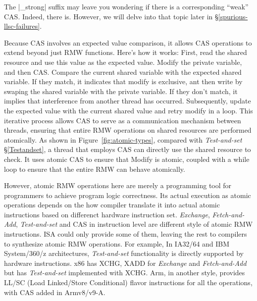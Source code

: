 \documentclass[fontsize=10pt, oneside]{scrartcl}
\newcommand{\fig}[1]{Figure~\ref{#1}}
\newcommand{\introduce}[1]{\textit{#1}}
\newcommand{\secref}[1]{\hyperref[#1]{\textsc{\S}\ref*{#1}}}
\begin{document}
\begin{samepage}
\noindent The \cpp|_strong| suffix may leave you wondering if there is a corresponding ``weak'' \textsc{CAS}.
Indeed, there is. However, we will delve into that topic later in \secref{spurious-llsc-failures}.
\end{samepage}

Because \textsc{CAS} involves an expected value comparison, 
it allows \textsc{CAS} operations to extend beyond just \textsc{RMW} functions. 
Here's how it works: First, read the shared resource and use this value as the expected value. 
Modify the private variable, and then \textsc{CAS}. Compare the current shared variable with the expected shared variable. 
If they match, it indicates that modify is exclusive, ant then write by swaping the shared variable with the private variable.
If they don't match, it implies that interference from another thread has occurred.
Subsequently, update the expected value with the current shared value and retry modify in a loop. 
This iterative process allows \textsc{CAS} to serve as a communication mechanism between threads, 
ensuring that entire \textsc{RMW} operations on shared resources are performed atomically.
As shown in \fig{fig:atomic-types}, compared with \introduce{Test-and-set} \secref{Testandset}, 
a thread that employs \textsc{CAS} can directly use the shared resource to check.
It uses atomic \textsc{CAS} to ensure that Modify is atomic, 
coupled with a while loop to ensure that the entire \textsc{RMW} can behave atomically.

However, atomic \textsc{RMW} operations here are merely a programming tool for programmers to achieve program logic correctness. 
Its actual execution as atomic operations depends on the how compiler translate it into actual atomic instructions based on differenct hardware instruction set. 
\introduce{Exchange}, \introduce{Fetch-and-Add}, \introduce{Test-and-set} and \textsc{CAS} in instruction level are different style of atomic \textsc{RMW} instructions. 
ISA could only provide some of them, 
leaving the rest to compilers to synthesize atomic \textsc{RMW} operations. 
For example, In IA32/64 and IBM System/360/z architectures, 
\introduce{Test-and-set} functionality is directly supported by hardware instructions. 
x86 has XCHG, XADD for \introduce{Exchange} and \introduce{Fetch-and-Add} but has \introduce{Test-and-set} implemented with XCHG. 
Arm, in another style, provides LL/SC (Load Linked/Store Conditional) flavor instructions for all the operations, 
with \textsc{CAS} added in Armv8/v9-A.
\end{document}
